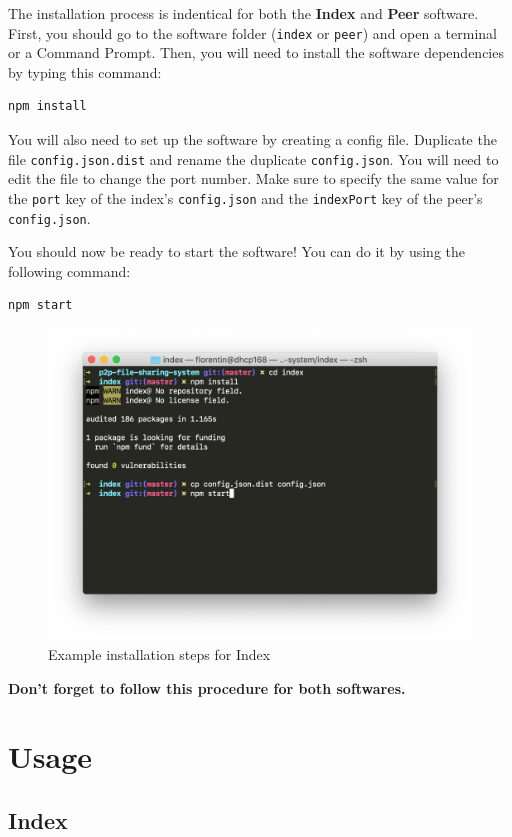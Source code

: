 \documentclass{article}
\begin{document}
The installation process is indentical for both the \textbf{Index} and \textbf{Peer} software. First, you should go to the software folder (\Verb+index+ or \Verb+peer+) and open a terminal or a Command Prompt. Then, you will need to install the software dependencies by typing this command:

\begin{Verbatim}
npm install
\end{Verbatim}

\noindent You will also need to set up the software by creating a config file. Duplicate the file \Verb+config.json.dist+ and rename the duplicate \Verb+config.json+. You will need to edit the file to change the port number. Make sure to specify the same value for the \Verb+port+ key of the index's \Verb+config.json+ and the \Verb+indexPort+ key of the peer's \Verb+config.json+.

\medskip

\noindent You should now be ready to start the software! You can do it by using the following command:

\begin{Verbatim}
npm start
\end{Verbatim}

\begin{figure}[h!]
	\centering
	\includegraphics[width=0.7\linewidth]{assets/install-example.png}
	\caption{Example installation steps for Index}
	\label{fig:install-example}
\end{figure}

\noindent \textbf{Don't forget to follow this procedure for both softwares.}

\section{Usage}

\subsection{Index}
\end{document}

